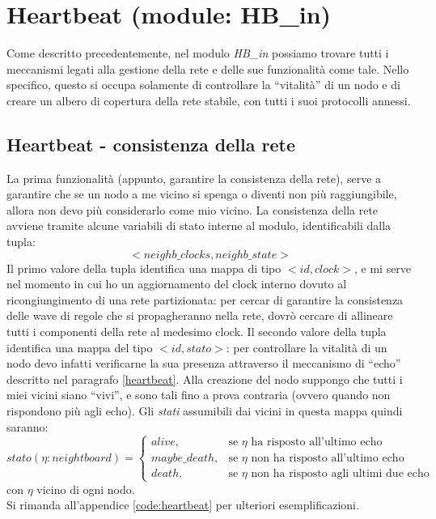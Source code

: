 \documentclass[italian]{memoir}
\begin{document}
\section{Heartbeat (module: HB\_in)}\label{impl:hbin}
Come descritto precedentemente, nel modulo \textit{HB\_in} possiamo trovare tutti i meccanismi legati alla gestione della rete e delle sue funzionalità come tale. Nello specifico, questo si occupa solamente di controllare la ``vitalità'' di un nodo e di creare un albero di copertura della rete stabile, con tutti i suoi protocolli annessi.

\subsection{Heartbeat - consistenza della rete}
La prima funzionalità (appunto, garantire la consistenza della rete), serve a garantire che se un nodo a me vicino si spenga o diventi non più raggiungibile, allora non devo più considerarlo come mio vicino. La consistenza della rete avviene tramite alcune variabili di stato interne al modulo, identificabili dalla tupla:
$$
    <neighb\_clocks, neighb\_state>
$$
Il primo valore della tupla identifica una mappa di tipo $<id,clock>$, e mi serve nel momento in cui ho un aggiornamento del clock interno dovuto al ricongiungimento di una rete partizionata: per cercar di garantire la consistenza delle wave di regole che si propagheranno nella rete, dovrò cercare di allineare tutti i componenti della rete al medesimo clock.
Il secondo valore della tupla identifica una mappa del tipo $<id,stato>$: per controllare la vitalità di un nodo devo infatti verificarne la sua presenza attraverso il meccanismo di ``echo'' descritto nel paragrafo \ref{heartbeat}. Alla creazione del nodo suppongo che tutti i miei vicini siano ``vivi'', e sono tali fino a prova contraria (ovvero quando non rispondono più agli echo). Gli \emph{stati} assumibili dai vicini in questa mappa quindi saranno:
$$
stato(\eta:neightboard)=\begin{cases}
                         alive, & \mbox{se }\eta\mbox{ ha risposto all'ultimo echo} \\
                         maybe\_death, & \mbox{se }\eta\mbox{ non ha risposto all'ultimo echo}\\
                         death, & \mbox{se }\eta\mbox{ non ha risposto agli ultimi due echo}
                   \end{cases}
$$
con $\eta$ vicino di ogni nodo.\\
Si rimanda all'appendice \ref{code:heartbeat} per ulteriori esemplificazioni.
\end{document}
